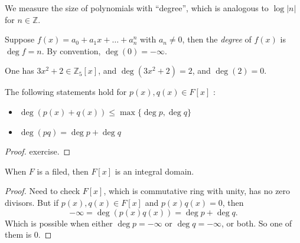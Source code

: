 We measure the size of polynomials with ``degree'', which is analogous to $\log|n|$ for $n \in \mathbb{Z}$.

\begin{definition}
	Suppose $f(x) = a_0+a_1x + \ldots + a_n ^n$ with $a_n \neq 0$, then the \textit{degree} of $f(x)$ is $\operatorname{deg} f = n$. By convention, $\operatorname{deg} (0) = -\infty $.
\end{definition}
\begin{example}
	One has $3x^2 + 2 \in \mathbb{Z}_5[x]$, and $\operatorname{deg} (3x^2 + 2) = 2$, and $\operatorname{deg} (2) = 0$. 
\end{example}
\begin{proposition}
	The following statements hold for $p(x), q(x) \in F[x]$ :
	\begin{itemize}
		\item $\operatorname{deg} \left( p(x) + q(x) \right) \le \max \{\operatorname{deg} p, \operatorname{deg} q\} $
		\item $\operatorname{deg} (pq) = \operatorname{deg} p + \operatorname{deg}  q$
	\end{itemize}
\end{proposition}
\begin{proof}
	exercise.
\end{proof}

\begin{lemma}
	When $F$ is a filed, then $F[x]$ is an integral domain.
\end{lemma}
\begin{proof}
	Need to check $F[x]$, which is commutative ring with unity, has no zero divisors. But if  $p(x) , q(x) \in F[x]$ and $p(x)q(x) = 0$, then
	\[
		- \infty = \operatorname{deg} \left( p(x)q(x) \right) =\operatorname{deg} p + \operatorname{deg} q
	.\] 
	Which is possible when either $\operatorname{deg} p = -\infty $ or $\operatorname{deg} q = -\infty $, or both. So one of them is $0$.
\end{proof}

